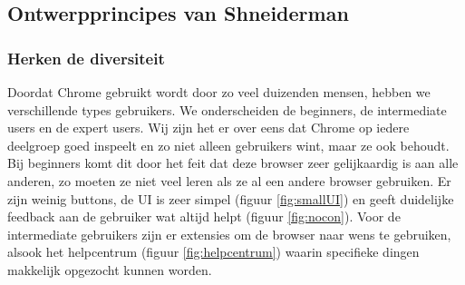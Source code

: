 \documentclass[12pt]{article}
\begin{document}
\subsection{Ontwerpprincipes van Shneiderman}
\subsubsection{Herken de diversiteit}
Doordat Chrome gebruikt wordt door zo veel duizenden mensen, hebben we verschillende types gebruikers. We onderscheiden de beginners, de intermediate users en de expert users. Wij zijn het er over eens dat Chrome op iedere deelgroep goed inspeelt en zo niet alleen gebruikers wint, maar ze ook behoudt. Bij beginners komt dit door het feit dat deze browser zeer gelijkaardig is aan alle anderen, zo moeten ze niet veel leren als ze al een andere browser gebruiken. Er zijn weinig buttons, de UI is zeer simpel (figuur \ref{fig:smallUI}) en geeft duidelijke feedback aan de gebruiker wat altijd helpt (figuur \ref{fig:nocon}). Voor de intermediate gebruikers zijn er extensies om de browser naar wens te gebruiken, alsook het helpcentrum (figuur \ref{fig:helpcentrum}) waarin specifieke dingen makkelijk opgezocht kunnen worden.
\end{document}
